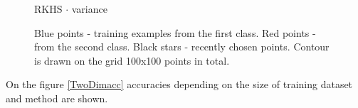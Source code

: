 \documentclass[a4paper]{article}
\begin{document}
\begin{figure}[h]
\begin{minipage}[h]{0.49\linewidth}
\end{minipage}
\hfill
\begin{minipage}[h]{0.49\linewidth}
 RKHS $\cdot$ variance
\end{minipage}

\caption{Blue points - training examples from the first class. Red points - from the second class. Black stars - recently chosen points. Contour is drawn on the grid 100x100 points in total.}
\label{contour_plots}
\end{figure}

\clearpage
On the figure \ref{TwoDimacc} accuracies depending on the size of training dataset and method are shown.
\end{document}
